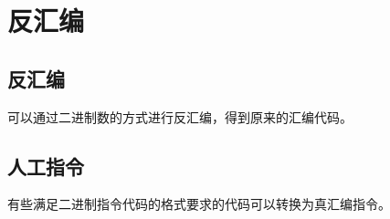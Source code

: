\documentclass[cn,11pt,chinese,black,simple]{../elegantbook}
\begin{document}
\fi 
\def\chapname{04decode}

\chapter{反汇编}

\section{反汇编}

可以通过二进制数的方式进行反汇编，得到原来的汇编代码。

\section{人工指令}

有些满足二进制指令代码的格式要求的代码可以转换为真汇编指令。


\let\chapname\undefined
\ifx\mainclass\undefined
\end{document}
